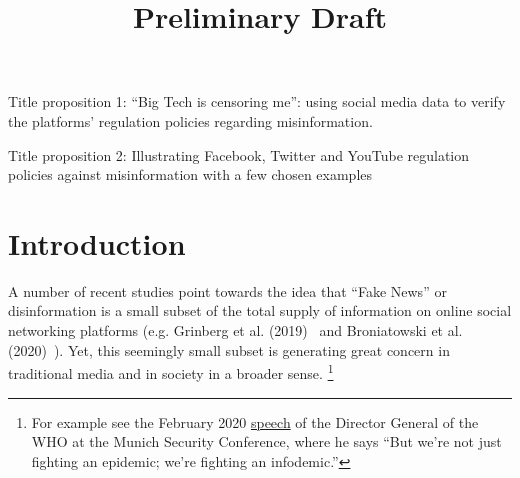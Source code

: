 \documentclass{article}
\begin{document}
\title{Preliminary Draft}

\maketitle

Title proposition 1: ``Big Tech is censoring me'': using social media data to verify the platforms' regulation policies regarding misinformation. 

Title proposition 2: Illustrating Facebook, Twitter and YouTube regulation policies against misinformation with a few chosen examples

\section{Introduction}

A number of recent studies  point towards the idea that ``Fake News'' or disinformation is a small subset of the total supply of information on online social networking platforms (e.g. Grinberg et al. (2019)~\cite{grinberg} and Broniatowski et al. (2020)~\cite{broniatowski}). Yet, this seemingly small subset is generating great concern in traditional media and in society in a broader sense. \footnote{For example see the February 2020 \href{https://www.who.int/director-general/speeches/detail/munich-security-conference}{speech} of the Director General of the WHO at the Munich Security Conference, where he says ``But we’re not just fighting an epidemic; we’re fighting an infodemic.''}
\end{document}

